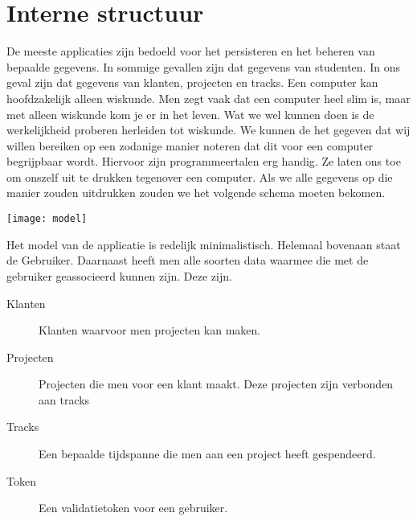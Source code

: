 \documentclass[a4paper,11pt]{article}
\begin{document}
\section{Interne structuur} %
De meeste applicaties zijn bedoeld voor het persisteren en het beheren van bepaalde gegevens. In sommige gevallen zijn dat gegevens van studenten. In ons geval zijn dat gegevens van klanten, projecten en tracks. Een computer kan hoofdzakelijk alleen wiskunde. Men zegt vaak dat een computer heel slim is, maar met alleen wiskunde kom je er in het leven. Wat we wel kunnen doen is de werkelijkheid proberen herleiden tot wiskunde. We kunnen de het gegeven dat wij willen bereiken op een zodanige manier noteren dat dit voor een computer begrijpbaar wordt. Hiervoor zijn programmeertalen erg handig. Ze laten ons toe om onszelf uit te drukken tegenover een computer. Als we alle gegevens op die manier zouden uitdrukken zouden we het volgende schema moeten bekomen.

\begin{center}
\begin{minipage}{\linewidth}
\centering
\texttt{[image: model]}
\end{minipage}
\end{center}

Het model van de applicatie is redelijk minimalistisch. Helemaal bovenaan staat de Gebruiker. Daarnaast heeft men alle soorten data waarmee die met de gebruiker geassocieerd kunnen zijn. Deze zijn.
\begin{description}
\item[Klanten] Klanten waarvoor men projecten kan maken.
\item[Projecten] Projecten die men voor een klant maakt. Deze projecten zijn verbonden aan tracks
\item[Tracks] Een bepaalde tijdspanne die men aan een project heeft gespendeerd.
\item[Token] Een validatietoken voor een gebruiker.
\end{description}
\end{document}
